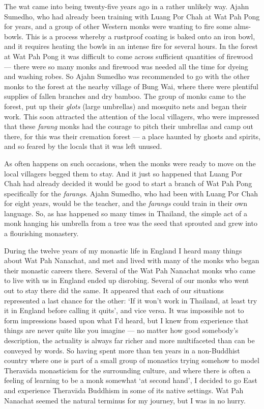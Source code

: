 The wat came into being twenty-five years ago in a rather unlikely way.
Ajahn Sumedho, who had already been training with Luang Por Chah at Wat
Pah Pong for years, and a group of other Western monks were wanting to
fire some alms-bowls. This is a process whereby a rustproof coating is
baked onto an iron bowl, and it requires heating the bowls in an intense
fire for several hours. In the forest at Wat Pah Pong it was difficult
to come across sufficient quantities of firewood --- there were so many
monks and firewood was needed all the time for dyeing and washing robes.
So Ajahn Sumedho was recommended to go with the other monks to the
forest at the nearby village of Bung Wai, where there were plentiful
supplies of fallen branches and dry bamboo. The group of monks came to
the forest, put up their \emph{glots} (large umbrellas) and mosquito
nets and began their work. This soon attracted the attention of the
local villagers, who were impressed that these \emph{farang} monks had
the courage to pitch their umbrellas and camp out there, for this was
their cremation forest --- a place haunted by ghosts and spirits, and so
feared by the locals that it was left unused.

As often happens on such occasions, when the monks were ready to move on
the local villagers begged them to stay. And it just so happened that
Luang Por Chah had already decided it would be good to start a branch of
Wat Pah Pong specifically for the \emph{farangs}. Ajahn Sumedho, who had
been with Luang Por Chah for eight years, would be the teacher, and the
\emph{farangs} could train in their own language. So, as has happened so
many times in Thailand, the simple act of a monk hanging his umbrella
from a tree was the seed that sprouted and grew into a flourishing
monastery.

During the twelve years of my monastic life in England I heard many
things about Wat Pah Nanachat, and met and lived with many of the monks
who began their monastic careers there. Several of the Wat Pah Nanachat
monks who came to live with us in England ended up disrobing. Several of
our monks who went out to stay there did the same. It appeared that each
of our situations represented a last chance for the other: `If it won't
work in Thailand, at least try it in England before calling it quits',
and vice versa. It was impossible not to form impressions based upon
what I'd heard, but I knew from experience that things are never quite
like you imagine --- no matter how good somebody's description, the
actuality is always far richer and more multifaceted than can be
conveyed by words. So having spent more than ten years in a non-Buddhist
country where one is part of a small group of monastics trying somehow
to model Theravāda monasticism for the surrounding culture, and where
there is often a feeling of learning to be a monk somewhat `at second
hand', I decided to go East and experience Theravāda Buddhism in some of
its native settings. Wat Pah Nanachat seemed the natural terminus for my
journey, but I was in no hurry.

